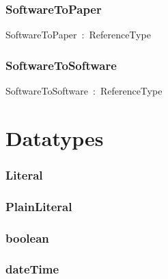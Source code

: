 \documentclass{article}
\begin{document}
\subsubsection*{SoftwareToPaper}

SoftwareToPaper~:~ReferenceType

\subsubsection*{SoftwareToSoftware}

SoftwareToSoftware~:~ReferenceType

\section*{Datatypes}\subsubsection*{Literal}

\subsubsection*{PlainLiteral}

\subsubsection*{boolean}

\subsubsection*{dateTime}
\end{document}
